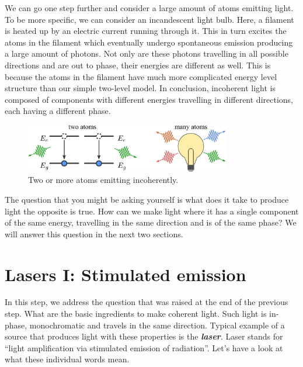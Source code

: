 We can go one step further and consider a large amount of atoms emitting light.
To be more specific, we can consider an incandescent light bulb.
Here, a filament is heated up by an electric current running through it.
This in turn excites the atoms in the filament which eventually undergo spontaneous emission producing a large amount of photons.
Not only are these photons travelling in all possible directions and are out to phase, their energies are different as well.
This is because the atoms in the filament have much more complicated energy level structure than our simple two-level model.
In conclusion, incoherent light is composed of components with different energies travelling in different directions, each having a different phase.

\begin{figure}
    \centering
    \includegraphics[width=0.8\textwidth]{lesson5/5-2_incoherent_emission.pdf}
    \caption[Incoherent emission]{Two or more atoms emitting incoherently.}
    \label{fig:5-2_incoherent_emission}
\end{figure}

The question that you might be asking yourself is what does it take to produce light the opposite is true.
How can we make light where it has a single component of the same energy, travelling in the same direction and is of the same phase?
We will answer this question in the next two sections.



\section{Lasers I: Stimulated emission}
\label{sec:5-3_lasers1}


In this step, we address the question that was raised at the end of the previous step.
What are the basic ingredients to make coherent light.
Such light is in-phase, monochromatic and travels in the same direction.
Typical example of a source that produces light with these properties is the \textit{\textbf{laser}}.
Laser stands for ``light amplification via stimulated emission of radiation''.
Let's have a look at what these individual words mean.

